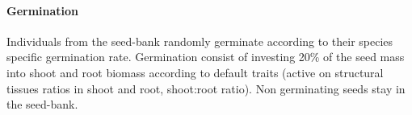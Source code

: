 \documentclass[a4paper,twoside, justified,marginals=raggedright]{tufte-handout}
\begin{document}
\paragraph{Germination} Individuals from the seed-bank randomly germinate according to their species specific germination rate. Germination consist of investing 20\% of the seed mass into shoot and root biomass according to default traits (active on structural tissues ratios in shoot and root, shoot:root ratio). Non germinating seeds stay in the seed-bank.\\
%
%
% 
%
%
\end{document}
